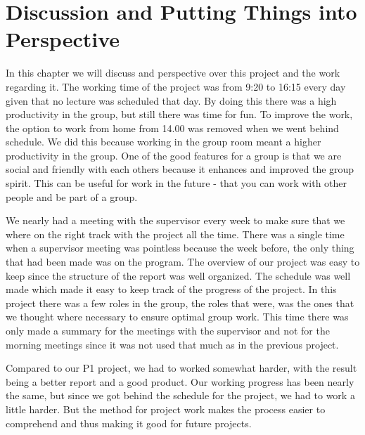 \chapter{Discussion and Putting Things into Perspective}
In this chapter we will discuss and perspective over this project and the work regarding it.
The working time of the project was from 9:20 to 16:15 every day given that no lecture was scheduled that day. By doing this there was a high productivity in the group, but still there was time for fun. To improve the work, the option to work from home from 14.00 was removed when we went behind schedule.
We did this because working in the group room meant a higher productivity in the group. One of the good features for a group is that we are social and friendly with each others because it enhances and improved the group spirit. This can be useful for work in the future - that you can work with other people and be part of a group.

We nearly had a meeting with the supervisor every week to make sure that we where on the right track with the project all the time. There was a single time when a supervisor meeting was pointless because the week before, the only thing that had been made was on the program. The overview of our project was easy to keep since the structure of the report was well organized. The schedule was well made which made it easy to keep track of the progress of the project. In this project there was a few roles in the group, the roles that were, was the ones that we thought where necessary to ensure optimal group work. This time there was only made a summary for the meetings with the supervisor and not for the morning meetings since it was not used that much as in the previous project. 

Compared to our P1 project, we had to worked somewhat harder, with the result being a better report and a good product. Our working progress has been nearly the same, but since we got behind the schedule for the project, we had to work a little harder. But the method for project work makes the process easier to comprehend and thus making it good for future projects.